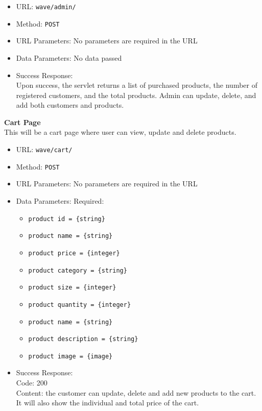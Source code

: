 \begin{itemize}
    \item URL: \texttt{wave/admin/}
    \item Method: \texttt{POST}
    \item URL Parameters: No parameters are required in the URL
      \item Data Parameters: No data passed
    \item Success Response:\\
    Upon success, the servlet returns a list of purchased products, the number of registered customers, and the total products. Admin can update, delete, and add both customers and products.


    
\end{itemize}

\noindent\textbf{Cart Page}\\
This will be a cart page where user can view, update and delete products.

\begin{itemize}
    \item URL: \texttt{wave/cart/}
    \item Method: \texttt{POST}
    \item URL Parameters: No parameters are required in the URL
      \item Data Parameters: 
      Required:
    
    \begin{itemize}
        \item \texttt{product id = \{string\}}
        \item \texttt{product name = \{string\}}
        \item \texttt{product price = \{integer\}}
        \item \texttt{product category = \{string\}}
        \item \texttt{product size = \{integer\}}
        \item \texttt{product quantity = \{integer\}}
        \item \texttt{product name = \{string\}}
        \item \texttt{product description = \{string\}}
        \item \texttt{product image = \{image\}}
       
    \end{itemize}
    
    
    \item Success Response:\\
    
    Code: 200\\
    Content: the customer can update, delete and add new products to the cart. It will also show the individual and total price of the cart. \\


    
\end{itemize}


